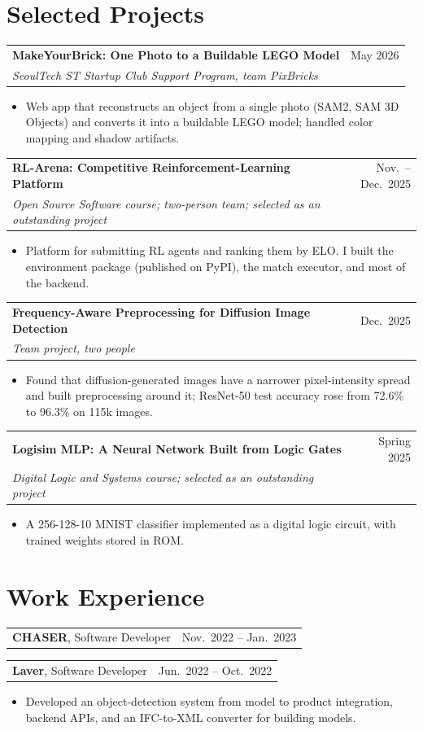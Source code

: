 \documentclass[10.5pt,a4paper]{article}
\makeatletter
\newcommand{\entry}[4]{%
  \begin{tabularx}{\textwidth}{@{}X@{\hspace{6pt}}r@{}}
    \textbf{#1} & #2\\[-1pt]
    \textit{#3} & \textit{#4}
  \end{tabularx}\vspace{-2pt}}
\newcommand{\oneline}[2]{%
  \begin{tabularx}{\textwidth}{@{}X@{\hspace{6pt}}r@{}}
    #1 & #2
  \end{tabularx}\vspace{-2pt}}
\newcommand{\gap}{\vspace{5pt}}
\makeatother
\begin{document}
\section{Selected Projects}
\entry{MakeYourBrick: One Photo to a Buildable LEGO Model}{May 2026}
      {SeoulTech ST Startup Club Support Program, team PixBricks}{}
\begin{itemize}
  \item Web app that reconstructs an object from a single photo (SAM2, SAM 3D Objects) and converts it into a buildable LEGO model; handled color mapping and shadow artifacts.
\end{itemize}
\gap
\entry{RL-Arena: Competitive Reinforcement-Learning Platform}{Nov.\ -- Dec.\ 2025}
      {Open Source Software course; two-person team; selected as an outstanding project}{}
\begin{itemize}
  \item Platform for submitting RL agents and ranking them by ELO. I built the environment package (published on PyPI), the match executor, and most of the backend.
\end{itemize}
\gap
\entry{Frequency-Aware Preprocessing for Diffusion Image Detection}{Dec.\ 2025}
      {Team project, two people}{}
\begin{itemize}
  \item Found that diffusion-generated images have a narrower pixel-intensity spread and built preprocessing around it; ResNet-50 test accuracy rose from 72.6\% to 96.3\% on 115k images.
\end{itemize}
\gap
\entry{Logisim MLP: A Neural Network Built from Logic Gates}{Spring 2025}
      {Digital Logic and Systems course; selected as an outstanding project}{}
\begin{itemize}
  \item A 256-128-10 MNIST classifier implemented as a digital logic circuit, with trained weights stored in ROM.
\end{itemize}

\section{Work Experience}
\oneline{\textbf{CHASER}, Software Developer}{Nov.\ 2022 -- Jan.\ 2023}
\oneline{\textbf{Laver}, Software Developer}{Jun.\ 2022 -- Oct.\ 2022}
\begin{itemize}
  \item Developed an object-detection system from model to product integration, backend APIs, and an IFC-to-XML converter for building models.
\end{itemize}
\end{document}
